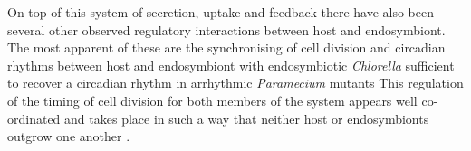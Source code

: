 On top of this system of secretion, uptake and feedback there have also been several other observed regulatory interactions between host and endosymbiont.  
The most apparent of these are the synchronising of cell division and circadian rhythms between host and endosymbiont \citep{Miwa1996} with endosymbiotic \textit{Chlorella} sufficient to recover a circadian rhythm in arrhythmic \textit{Paramecium} mutants \citep{Miwa2009}
This regulation of the timing of cell division for both members of the system appears well co-ordinated and takes place in such a way that neither host or endosymbionts outgrow one another \citep{Kadono2004,Takahashi2007}.



